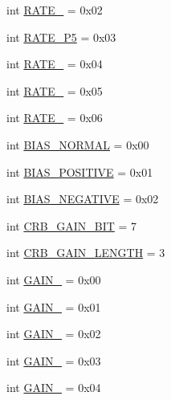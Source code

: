\begin{DoxyCompactItemize}
int \hyperlink{classconcretesensor_1_1hmc5883l_1_1HMC5883L_a65b22c8b0896a3e39518b401146a4bf9}{R\+A\+T\+E\+\_} = 0x02
\item 
int \hyperlink{classconcretesensor_1_1hmc5883l_1_1HMC5883L_a847c7ba6b42d8a9b0b0f8134300e1dfd}{R\+A\+T\+E\+\_\+P5} = 0x03
\item 
int \hyperlink{classconcretesensor_1_1hmc5883l_1_1HMC5883L_ae1704c1385ad6c2677935cecbf924340}{R\+A\+T\+E\+\_} = 0x04
\item 
int \hyperlink{classconcretesensor_1_1hmc5883l_1_1HMC5883L_a792e782c8f052adee57c139fa5b8326d}{R\+A\+T\+E\+\_} = 0x05
\item 
int \hyperlink{classconcretesensor_1_1hmc5883l_1_1HMC5883L_a2fc72f5e46c19287362a3f55ebed75b4}{R\+A\+T\+E\+\_} = 0x06
\item 
int \hyperlink{classconcretesensor_1_1hmc5883l_1_1HMC5883L_a8bfdfa1c6190fa5b2647661607394979}{B\+I\+A\+S\+\_\+\+N\+O\+R\+M\+A\+L} = 0x00
\item 
int \hyperlink{classconcretesensor_1_1hmc5883l_1_1HMC5883L_a52fbac2ae5dd86e4570d1a6acae74f5b}{B\+I\+A\+S\+\_\+\+P\+O\+S\+I\+T\+I\+V\+E} = 0x01
\item 
int \hyperlink{classconcretesensor_1_1hmc5883l_1_1HMC5883L_aed9f600e65e1d7aa10e613e93403f52a}{B\+I\+A\+S\+\_\+\+N\+E\+G\+A\+T\+I\+V\+E} = 0x02
\item 
int \hyperlink{classconcretesensor_1_1hmc5883l_1_1HMC5883L_a129957627154e1902a8b7ae98ccacaab}{C\+R\+B\+\_\+\+G\+A\+I\+N\+\_\+\+B\+I\+T} = 7
\item 
int \hyperlink{classconcretesensor_1_1hmc5883l_1_1HMC5883L_ac4faa97008f56c39dbcf1069ba543fd1}{C\+R\+B\+\_\+\+G\+A\+I\+N\+\_\+\+L\+E\+N\+G\+T\+H} = 3
\item 
int \hyperlink{classconcretesensor_1_1hmc5883l_1_1HMC5883L_ad7600653ff3cc29e6c0f42186dc10e73}{G\+A\+I\+N\+\_} = 0x00
\item 
int \hyperlink{classconcretesensor_1_1hmc5883l_1_1HMC5883L_a2eaddd86f08aff2e943fe2e885973bc1}{G\+A\+I\+N\+\_} = 0x01
\item 
int \hyperlink{classconcretesensor_1_1hmc5883l_1_1HMC5883L_aae76a890be2412717769158e09acbfd8}{G\+A\+I\+N\+\_} = 0x02
\item 
int \hyperlink{classconcretesensor_1_1hmc5883l_1_1HMC5883L_a6c9e880227cd7677563dfe82bcdf8ba5}{G\+A\+I\+N\+\_} = 0x03
\item 
int \hyperlink{classconcretesensor_1_1hmc5883l_1_1HMC5883L_ad919dceb04f20703e517de6c69c50908}{G\+A\+I\+N\+\_} = 0x04
\item 

\end{DoxyCompactItemize}
